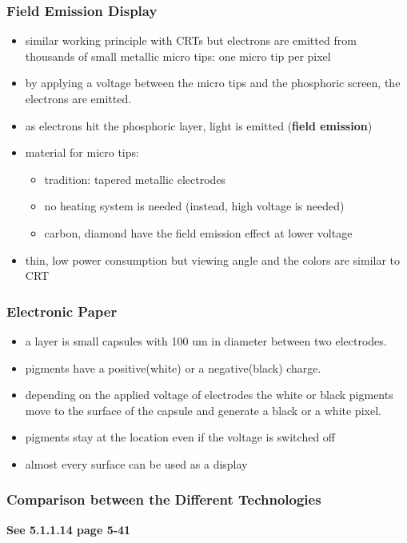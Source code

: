 \documentclass{standalone}
\begin{document}
\subsubsection*{Field Emission Display}
\begin{itemize}
\item similar working principle with CRTs but electrons are emitted from thousands of small metallic micro tips: one micro tip per pixel
\item by applying a voltage between the micro tips and the phosphoric screen, the electrons are emitted. 
\item as electrons hit the phosphoric layer, light is emitted (\textbf{field emission})
\item material for micro tips:
	\begin{itemize}
		\item tradition: tapered metallic electrodes
		\item no heating system is needed (instead, high voltage is needed)
		\item carbon, diamond have the field emission effect at lower voltage 
	\end{itemize}
\item thin, low power consumption but viewing angle and the colors are similar to CRT
\end{itemize}

\subsubsection*{Electronic Paper}
\begin{itemize}
\item a layer is small capsules with 100 um in diameter between two electrodes. 
\item pigments have a positive(white) or a negative(black) charge. 
\item depending on the applied voltage of electrodes the white or black pigments move to the surface of the capsule and generate a black or a white pixel. 
\item pigments stay at the location even if the voltage is switched off 
\item almost every surface can be used as a display
\end{itemize}

\subsubsection*{Comparison between the Different Technologies}
\textbf{See 5.1.1.14 page 5-41}
\end{document}
